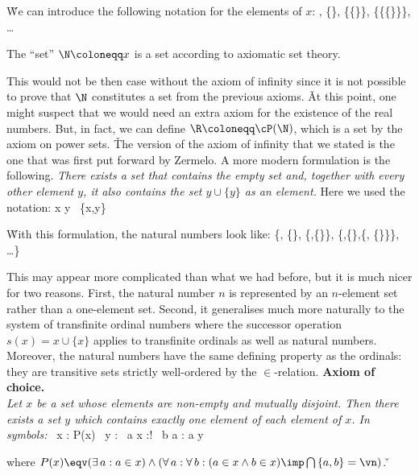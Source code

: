 \v

We can introduce the following notation for the elements of $x$:
 \coloneqq \vn,  \coloneqq \{\vn\}, \coloneqq \{\{\vn\}\},  \coloneqq \{\{\{\vn\}\}\}, \quad
\ldots
\ese

\vspace{-10pt}

\bt[]
The ``set'' $\N\coloneqq x$\index{$\N$} is a set according to axiomatic set theory.
\et

This would not be then case without the axiom of infinity since it is not possible to prove that $\N$ constitutes a
set from the previous axioms. \v

At this point, one might suspect that we would need an extra axiom for the existence of the real numbers. But, in
fact, we can define $\R \coloneqq \cP(\N)$, which is a set by the axiom on power sets. \v

The version of the axiom of infinity that we stated is the one that was first put forward by Zermelo. A more modern
formulation is the following. \emph{There exists a set that contains the empty set and, together with every other
element $y$, it also contains the set $y\cup\{y\}$ as an element.} Here we used the notation:
\bse
x \cup y \coloneqq \bigcup \, \{x,y\}
\ese

\v

With this formulation, the natural numbers look like:
\bse
\N \coloneqq \{\vn, \{\vn\}, \{\vn,\{\vn\}\}, \{\vn,\{\vn\},\{\vn, \{\vn\}\}\}, \ldots \}
\ese

This may appear more complicated than what we had before, but it is much nicer for two reasons. First, the natural
number $n$ is represented by an $n$-element set rather than a one-element set. Second, it generalises much more
naturally to the system of transfinite ordinal numbers where the successor operation $s(x)=x\cup\{x\}$ applies to
transfinite ordinals as well as natural numbers. Moreover, the natural numbers have the same defining property as the
ordinals: they are transitive sets strictly well-ordered by the $\in$-relation. \v

\textbf{Axiom of choice.}\\
\emph{Let $x$ be a set whose elements are non-empty and mutually disjoint. Then there exists a set $y$ which contains
exactly one element of each element of $x$. In symbols:}
\bse
\forall \, x : P(x) \imp \exists \, y : \forall \, a \in x :\exists! \, b \in a : a \in y
\ese

where $P(x) \eqv (\exists \,a : a \in x) \land \left(\forall \, a : \forall \, b : (a\in x \land b \in x) \imp
\bigcap \, \{a,b\} = \vn \right)$. \v

